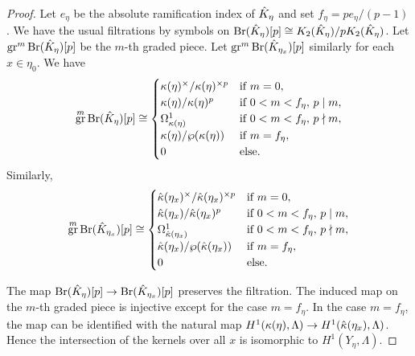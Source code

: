 \documentclass{amsart}
\theoremstyle{remark}
\numberwithin{equation}{section}
\DeclareMathOperator{\gr}{gr}
\DeclareMathOperator{\Br}{Br}
\begin{document}
\begin{proof}
	Let $e_{\eta}$ be the absolute ramification index of $\Hat{K}_{\eta}$
	and set $f_{\eta} = p e_{\eta} / (p - 1)$.
	We have the usual filtrations by symbols on
	$\Br(\Hat{K}_{\eta})[p] \cong K_{2}(\Hat{K}_{\eta}) / p K_{2}(\Hat{K}_{\eta})$.
	Let $\gr^{m} \Br(\Hat{K}_{\eta})[p]$ be the $m$-th graded piece.
	Let $\gr^{m} \Br(\Hat{K}_{\eta_{x}})[p]$ similarly for each $x \in \eta_{0}$.
	We have
		\[
				\gr^{m} \Br(\Hat{K}_{\eta})[p]
			\cong
				\begin{cases}
						\kappa(\eta)^{\times} / \kappa(\eta)^{\times p}
					&	\text{if }
						m = 0,
					\\
						\kappa(\eta) / \kappa(\eta)^{p}
					&	\text{if }
						0 < m < f_{\eta},\, p \mid m,
					\\
						\Omega_{\kappa(\eta)}^{1}
					&	\text{if }
						0 < m < f_{\eta},\, p \nmid m,
					\\
						\kappa(\eta) / \wp(\kappa(\eta))
					&	\text{if }
						m = f_{\eta},
					\\
						0
					&	\text{else.}
				\end{cases}
		\]
	Similarly,
		\[
				\gr^{m} \Br(\Hat{K}_{\eta_{x}})[p]
			\cong
				\begin{cases}
						\Hat{\kappa}(\eta_{x})^{\times} / \Hat{\kappa}(\eta_{x})^{\times p}
					&	\text{if }
						m = 0,
					\\
						\Hat{\kappa}(\eta_{x}) / \Hat{\kappa}(\eta_{x})^{p}
					&	\text{if }
						0 < m < f_{\eta},\, p \mid m,
					\\
						\Omega_{\Hat{\kappa}(\eta_{x})}^{1}
					&	\text{if }
						0 < m < f_{\eta},\, p \nmid m,
					\\
						\Hat{\kappa}(\eta_{x}) / \wp(\Hat{\kappa}(\eta_{x}))
					&	\text{if }
						m = f_{\eta},
					\\
						0
					&	\text{else.}
				\end{cases}
		\]
	
	The map $\Br(\Hat{K}_{\eta})[p] \to \Br(\Hat{K}_{\eta_{x}})[p]$ preserves the filtration.
	The induced map on the $m$-th graded piece
	is injective except for the case $m = f_{\eta}$.
	In the case $m = f_{\eta}$, the map can be identified with
	the natural map $H^{1}(\kappa(\eta), \Lambda) \to H^{1}(\Hat{\kappa}(\eta_{x}), \Lambda)$.
	Hence the intersection of the kernels over all $x$ is isomorphic to $H^{1}(Y_{\eta}, \Lambda)$.
\end{proof}
\end{document}
